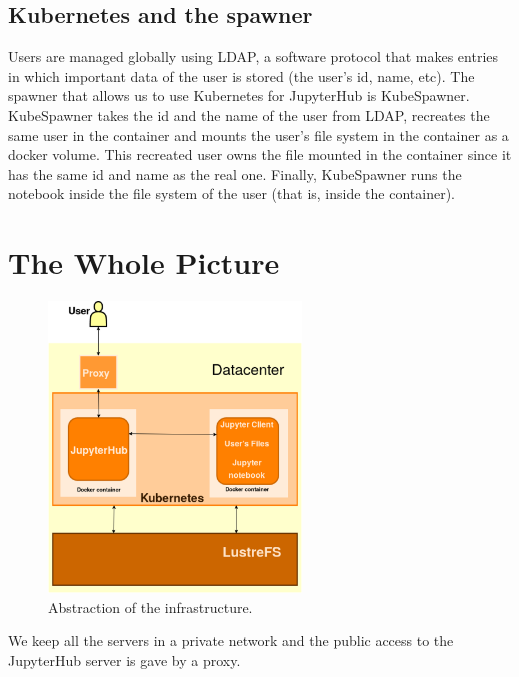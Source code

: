 \documentclass[11pt,twoside]{article}
\begin{document}
\subsection{Kubernetes and the spawner}

Users are managed globally using LDAP, a software protocol that makes entries in which important data of the user is stored (the user's id, name, etc). The spawner that allows us to use Kubernetes for JupyterHub is KubeSpawner. KubeSpawner takes the id and the name of the user from LDAP, recreates the same user in the container and mounts the user's file system in the container as a docker volume. This recreated user owns the file mounted in the container since it has the same id and name as the real one. Finally, KubeSpawner runs the notebook inside the file system of the user (that is, inside the container).

\section{The Whole Picture}

\begin{figure}[ht!]
\begin{center}
\includegraphics[width=0.6\textwidth]{P6-67_f1.eps}
\caption{Abstraction of the infrastructure.}
\label{all}
\end{center}
\end{figure}

We keep all the servers in a private network and the public access to the JupyterHub server is gave by a proxy.
\end{document}
